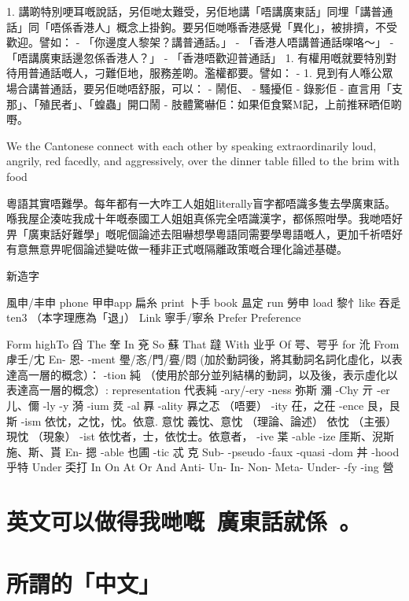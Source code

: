\documentclass[a5paper, 10pt, openany]{book} %
\begin{document}
1. 講啲特別哽耳嘅說話，另佢哋太難受，另佢地講「唔講廣東話」同埋「講普通話」同「唔係香港人」概念上掛鉤。要另佢哋喺香港感覺「異化」，被排擠，不受歡迎。譬如：
- 「你邊度人黎架？講普通話。」
- 「香港人唔講普通話㗎咯～」
- 「唔講廣東話邊忽係香港人？」
- 「香港唔歡迎普通話」
1. 有權用嘅就要特別對待用普通話嘅人，刁難佢地，服務差啲。濫權都要。譬如：
-
1. 見到有人喺公眾場合講普通話，要另佢哋唔舒服，可以：
- 鬧佢、
- 騷擾佢
- 錄影佢
- 直言用「支那」、「殖民者」、「蝗蟲」開口鬧
- 肢體驚嚇佢：如果佢食緊M記，上前推冧晒佢啲嘢。




We the Cantonese connect with each other by speaking extraordinarily loud, angrily, red facedly, and aggressively, over the dinner table filled to the brim with food


粵語其實唔難學。每年都有一大咋工人姐姐literally盲字都唔識多隻去學廣東話。喺我屋企湊咗我成十年嘅泰國工人姐姐真係完全唔識漢字，都係照咁學。我哋唔好畀「廣東話好難學」嘅呢個論述去阻嚇想學粵語同需要學粵語嘅人，更加千祈唔好有意無意畀呢個論述變咗做一種非正式嘅隔離政策嘅合理化論述基礎。



新造字

風申/丰申 phone
甲申app
扁糸 print
卜手 book
昷定 run
勞申 load
黎忄like
吞辵 ten3 （本字理應為「退」）
Link 寧手/寧糸
Prefer
Preference

Form
highTo 舀
The 羍
In 兗
So 蘇
That 躂
With 业乎
Of 咢、咢乎
for 沎
From 虖壬/冘
En- 恩-
-ment 璺/忞/門/亹/悶 (加於動詞後，將其動詞名詞化虛化，以表達高一層的概念）：
-tion 純 （使用於部分並列結構的動詞，以及後，表示虛化以表達高一層的概念）: representation 代表純
-ary/-ery
-ness 弥斯 瀰
-Chy 亓
-er 儿、儞
-ly
-y 漪
-ium 烎
-al 奡
-ality 奡之忑 （唔要）
-ity 茌，之茌
-ence 艮，艮斯
-ism 依忱，之忱，忱。依意. 意忱
義忱、意忱  （理論、論述）
依忱  （主張）
現忱  （現象）
-ist 依忱者，士，依忱士。依意者，
-ive 枼
-able
-ize 厓斯、淣斯 施、斯、貰
En- 摁
-able 也圃
-tic 忒 克
Sub-
-pseudo
-faux
-quasi
-dom 丼
-hood 乎特
Under 奀打
In
On
At
Or
And
Anti-
Un-
In-
Non-
Meta-
Under-
-fy
-ing 營


\chapter{英文可以做得我哋嘅，廣東話就係。}





\chapter{所謂的「中文」}
\end{document}
